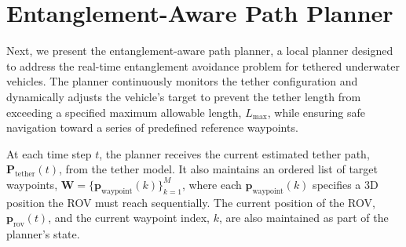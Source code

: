 







\section{Entanglement-Aware Path Planner}
\label{sec:planner}


Next, we present the entanglement-aware path planner, a local planner designed to address the real-time entanglement avoidance problem for tethered underwater vehicles. The planner continuously monitors the tether configuration and dynamically adjusts the vehicle’s target to prevent the tether length from exceeding a specified maximum allowable length, \( L_{\max} \), while ensuring safe navigation toward a series of predefined reference waypoints.

At each time step \( t \), the planner receives the current estimated tether path, \(\mathbf{P}_{\mathrm{tether}}(t)\), from the tether model. It also maintains an ordered list of target waypoints, \(\mathbf{W} = \{\mathbf{p}_{\text{waypoint}}(k)\}_{k=1}^M\), where each \(\mathbf{p}_{\text{waypoint}}(k)\) specifies a 3D position the ROV must reach sequentially. The current position of the ROV, \(\mathbf{p}_{\text{rov}}(t)\), and the current waypoint index, \(k\), are also maintained as part of the planner’s state.

